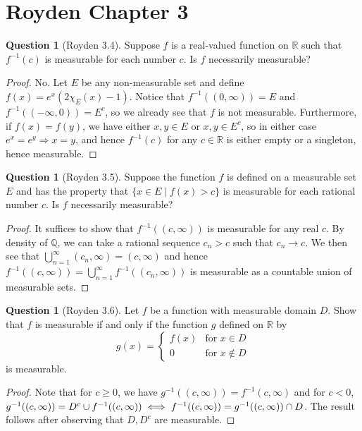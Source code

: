\documentclass{article}
\renewcommand{\implies}{\Rightarrow}
\newcommand{\Q}{\mathbb{Q}}
\newcommand{\R}{\mathbb{R}}
\theoremstyle{definition} %
\numberwithin{thm}{section} %
\theoremstyle{definition} %
\newtheorem{question}[thm]{Question}
\begin{document}
\section{Royden Chapter 3}

\begin{question}[Royden 3.4]
Suppose $f$ is a real-valued function on $\mathbb{R}$ such that $f^{-1}(c)$ is measurable for each number $c$. Is $f$ necessarily measurable?
\end{question}
\begin{proof}
No. Let $E$ be any non-measurable set and define $f(x) = e^x(2\chi_E(x) - 1)$. Notice that $f^{-1}((0, \infty)) = E$ and $f^{-1}((-\infty, 0)) = E^c$, so we already see that $f$ is not measurable. Furthermore, if $f(x) = f(y)$, we have either $x, y \in E$ or $x, y \in E^c$, so in either case $e^x = e^y \implies x = y$, and hence $f^{-1}(c)$ for any $c \in \R$ is either empty or a singleton, hence measurable.
\end{proof}

\begin{question}[Royden 3.5]
Suppose the function $f$ is defined on a measurable set $E$ and has the property that $\{x \in E \mid f(x) > c\}$ is measurable for each rational number $c$. Is $f$ necessarily measurable?
\end{question}
\begin{proof}
It suffices to show that $f^{-1}((c, \infty))$ is measurable for any real $c$. By density of $\Q$, we can take a rational sequence $c_n > c$ such that $c_n \to c$. We then see that $\bigcup_{n = 1}^\infty (c_n, \infty) = (c, \infty)$ and hence $f^{-1}((c, \infty)) = \bigcup_{n = 1}^\infty f^{-1}((c_n, \infty))$ is measurable as a countable union of measurable sets.
\end{proof}

\begin{question}[Royden 3.6]
Let $f$ be a function with measurable domain $D$. Show that $f$ is measurable if and only if the function $g$ defined on $\mathbb{R}$ by 
\[
g(x) = 
\begin{cases}
f(x) & \text{for } x \in D \\
0 & \text{for } x \notin D
\end{cases}
\]
is measurable.
\end{question}
\begin{proof}
Note that for $c \geq 0$, we have $g^{-1}((c, \infty)) = f^{-1}(c, \infty)$ and for $c < 0$, $g^{-1}((c, \infty)) = D^c \cup f^{-1}((c, \infty)) \\\iff f^{-1}((c, \infty)) = g^{-1}((c, \infty)) \cap D$. The result follows after observing that $D, D^c$ are measurable.
\end{proof}
\end{document}
